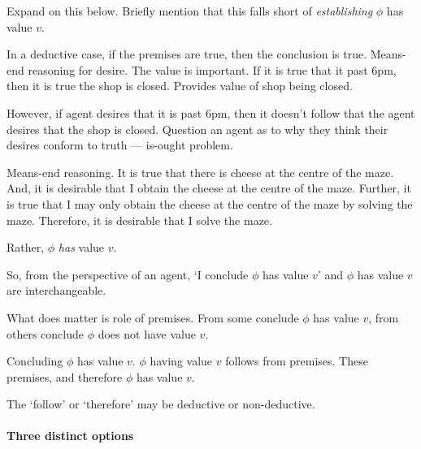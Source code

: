 \begin{note}
  Expand on this below.
  Briefly mention that this falls short of \emph{establishing} \(\phi\) has value \(v\).
\end{note}

\begin{note}
  In a deductive case, if the premises are true, then the conclusion is true.
  Means-end reasoning for desire.
  The value is important.
  If it is true that it past 6pm, then it is true the shop is closed.
  Provides value of shop being closed.

  However, if agent desires that it is past 6pm, then it doesn't follow that the agent desires that the shop is closed.
  Question an agent as to why they think their desires conform to truth --- is-ought problem.

  Means-end reasoning.
  It is true that there is cheese at the centre of the maze.
  And, it is desirable that I obtain the cheese at the centre of the maze.
  Further, it is true that I may only obtain the cheese at the centre of the maze by solving the maze.
  Therefore, it is desirable that I solve the maze.
\end{note}

\begin{note}[`Concluding']
  Rather, \(\phi\) \emph{has} value \(v\).

  So, from the perspective of an agent, `I conclude \(\phi\) has value \(v\)' and \(\phi\) has value \(v\) are interchangeable.
\end{note}

\begin{note}
  What does matter is role of premises.
  From some conclude \(\phi\) has value \(v\), from others conclude \(\phi\) does not have value \(v\).
\end{note}

\begin{note}[Generally]
  Concluding \(\phi\) has value \(v\).
  \(\phi\) having value \(v\) follows from premises.
  These premises, and therefore \(\phi\) has value \(v\).

  The `follow' or `therefore' may be deductive or non-deductive.
\end{note}

\paragraph{Three distinct options}

